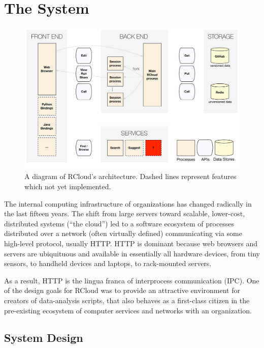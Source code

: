 \section{The System}


\begin{figure}
\includegraphics[width=\linewidth]{fig/system/system.pdf}
\caption{\label{fig:system}A diagram of RCloud's architecture. Dashed
  lines represent features which not yet implemented.}
\end{figure}

The internal computing infrastructure of organizations has changed
radically in the last fifteen years. The shift from large
servers toward scalable, lower-cost, distributed systems (``the cloud'')
led to a software ecosystem of processes distributed over a
network (often virtually defined) communicating via some
high-level protocol, usually HTTP.  HTTP is dominant because web
browsers and servers are ubiquituous and available in essentially
all hardware devices, from tiny sensors, to handheld devices and
laptops, to rack-mounted servers.

As a result, HTTP is the lingua franca of interprocess communication
(IPC). One of the design goals for RCloud was to provide an attractive
environment for creators of data-analysis scripts, that also behaves
as a first-class citizen in the pre-existing ecosystem of computer
services and networks with an organization.


\subsection{System Design}

